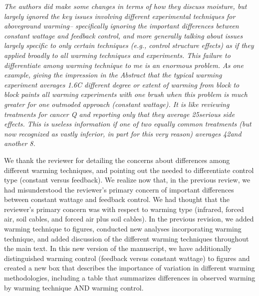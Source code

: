 \documentclass[11pt,a4paper]{letter}
\begin{document}
\begin{letter}{}
\par \emph{The authors did make some changes in terms of how they discuss moisture, but largely ignored the key issues involving different experimental techniques for aboveground warming-- specifically ignoring the important differences between constant wattage and feedback control, and more generally talking about issues largely specific to only certain techniques (e.g., control structure effects) as if they applied broadly to all warming techniques and experiments. This failure to differentiate among warming technique to me is an enormous problem. As one example, giving the impression in the Abstract that the typical warming experiment averages 1.6C different degree or extent of warming from block to block paints all warming experiments with one brush when this problem is much greater for one outmoded approach (constant
wattage). It is like reviewing treatments for cancer Q and reporting only that they average 25\percent serious side effects. This is useless information if one of two equally common treatments (but now recognized as vastly inferior, in part for this very reason) averages 42\percent and another 8\percent.}
\par We thank the reviewer for detailing the concerns about differences among different warming techniques, and pointing out the needed to differentiate control type (constant versus feedback). We realize now that, in the previous review, we had misunderstood the reviewer's primary concern of important differences between constant wattage and feedback control. We had thought that the reviewer's primary concern was with respect to warming type (infrared, forced air, soil cables, and forced air plus soil cables). In the previous revision, we added warming technique to figures, conducted new analyses incorporating warming technique, and added discussion of the different warming techniques throughout the main text.  In this new version of the manuscript, we have additionally distinguished warming control (feedback versus constant wattage) to figures and created a new box that describes the importance of variation in different warming methodologies, including a table that summarizes differences in observed warming by warming technique AND warming control. 
 

\end{letter}
\end{document}
